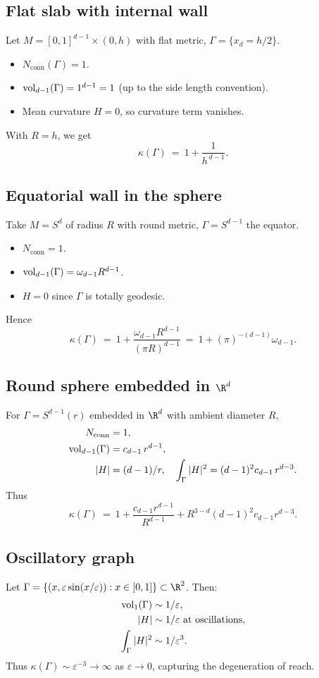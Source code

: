 \subsection{Flat slab with internal wall}
\label{subsec:flat-slab}
Let $M=[0,1]^{d-1}\times(0,h)$ with flat metric, $\Gamma=\{x_d=h/2\}$.
\begin{itemize}
\item $N_{\mathrm{conn}}(\Gamma)=1$.
\item $\operatorname{vol}_{d-1}(\Gamma)=1^{d-1}=1$ (up to the side length convention).
\item Mean curvature $H=0$, so curvature term vanishes.
\end{itemize}
With $R=h$, we get
\[
\kappa(\Gamma)\ =\ 1+\frac{1}{h^{\,d-1}}.
\]

\subsection{Equatorial wall in the sphere}
\label{subsec:equator}
Take $M=S^d$ of radius $R$ with round metric, $\Gamma=S^{d-1}$ the equator.
\begin{itemize}
\item $N_{\mathrm{conn}}=1$.
\item $\operatorname{vol}_{d-1}(\Gamma)=\omega_{d-1}R^{d-1}$.
\item $H=0$ since $\Gamma$ is totally geodesic.
\end{itemize}
Hence
\[
\kappa(\Gamma)\ =\ 1+\frac{\omega_{d-1}R^{d-1}}{(\pi R)^{d-1}}\ =\ 1+(\pi)^{-(d-1)}\omega_{d-1}.
\]

\subsection{Round sphere embedded in $\R^d$}
\label{subsec:round-sphere}
For $\Gamma=S^{d-1}(r)$ embedded in $\R^d$ with ambient diameter $R$,
\begin{align*}
N_{\mathrm{conn}}&=1,\\
\operatorname{vol}_{d-1}(\Gamma)&=c_{d-1}\,r^{d-1},\\
|H|&=(d-1)/r,\quad \int_\Gamma |H|^2 = (d-1)^2 c_{d-1}\, r^{d-3}.
\end{align*}
Thus
\[
\kappa(\Gamma)\ =\ 1+\frac{c_{d-1}r^{d-1}}{R^{d-1}}+R^{3-d}(d-1)^2c_{d-1}r^{d-3}.
\]

\subsection{Oscillatory graph}
\label{subsec:oscillatory}
Let $\Gamma=\{(x,\varepsilon\sin(x/\varepsilon)):x\in[0,1]\}\subset \R^2$.
Then:
\begin{align*}
\operatorname{vol}_1(\Gamma)&\sim 1/\varepsilon,\\
|H|&\sim 1/\varepsilon\ \text{at oscillations},\\
\int_\Gamma |H|^2 &\sim 1/\varepsilon^3.
\end{align*}
Thus $\kappa(\Gamma)\sim \varepsilon^{-3}\to \infty$ as $\varepsilon\to 0$,
capturing the degeneration of reach.


